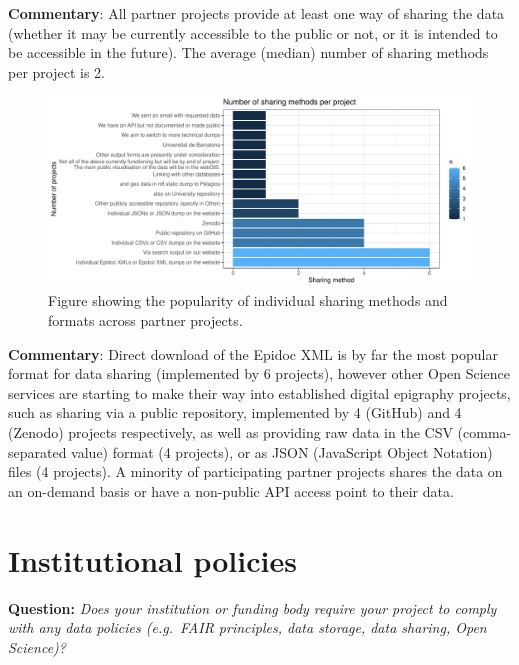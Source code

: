 \documentclass[
  12pt,
]{scrreprt}
\begin{document}
\textbf{Commentary}: All partner projects provide at least one way of
sharing the data (whether it may be currently accessible to the public
or not, or it is intended to be accessible in the future). The average
(median) number of sharing methods per project is 2.

\begin{figure}

{\centering \includegraphics{01_FAIR_epi_report_files/figure-latex/unnamed-chunk-11-1} 

}

\caption{Figure showing the popularity of individual sharing methods and formats across partner projects.}\label{fig:unnamed-chunk-11}
\end{figure}

\textbf{Commentary}: Direct download of the Epidoc XML is by far the
most popular format for data sharing (implemented by 6 projects),
however other Open Science services are starting to make their way into
established digital epigraphy projects, such as sharing via a public
repository, implemented by 4 (GitHub) and 4 (Zenodo) projects
respectively, as well as providing raw data in the CSV (comma-separated
value) format (4 projects), or as JSON (JavaScript Object Notation)
files (4 projects). A minority of participating partner projects shares
the data on an on-demand basis or have a non-public API access point to
their data.

\hypertarget{institutional-policies}{%
\section{Institutional policies}\label{institutional-policies}}

\textbf{Question:} \emph{Does your institution or funding body require
your project to comply with any data policies (e.g.~FAIR principles,
data storage, data sharing, Open Science)?}
\end{document}

